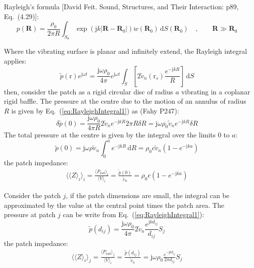 \documentclass[a4paper,UTF8]{ctexart}
\begin{document}
	Rayleigh's formula [David Feit. Sound, Structures, and Their Interaction: p89, Eq.~(4.29)]:
	\begin{equation}
	\label{eq:RayleighIntegral}
	p\left(\bm{R}\right)
	= \frac{\rho_0}{2\pi R}
		\int_{S_0} \exp\left(\mathrm jk\left\lvert\bm{R-R}_0\right\rvert \right)
		\ddot{w}\left(\bm{R}_0\right) \,\mathrm{d}S\left(\bm{R}_0\right)
			\quad,\qquad\bm{R}\gg\bm{R}_0
	\end{equation}
	
	Where the vibrating surface is planar and infinitely extend, the Rayleigh integral applies:
	\begin{equation}
	\label{eq:RayleighIntegral1}
	\tilde{p} \left( \bm{\mathrm{r}} \right) e^{\mathrm j\omega t} 
		= \frac{\mathrm j\omega\rho_0}{4\pi} e^{\mathrm j\omega t}
			\int_S \left[ 2\tilde{v}_n\left( \bm{\mathrm{r}}_s\right)
				\frac{e^{-\mathrm jkR}}{R} \right] \,\mathrm{d}S
	\end{equation}
	then, consider the patch as a rigid circular disc of radius $a$ vibrating in a coplanar rigid baffle. The pressure at the centre due to the motion of an annulus of radius $R$ is given by Eq.~(\ref{eq:RayleighIntegral1}) as (Fahy P247):
	\begin{equation}
	\label{eq:deltaP}
	\delta \tilde {p}\left(0\right)
		=\frac{\mathrm j\omega\rho_0}{4\pi R} 
			2\tilde{v}_n e^{-\mathrm jkR} 2\pi R \delta R
		= \mathrm j \omega \rho_0 \tilde{v}_n e^{-\mathrm jkR} \delta R
	\end{equation}
	The total pressure at the centre is given by the integral over the limits 0 to $a$:
	\begin{equation}
	\label{eq:RadiatedImpPslef}
	\tilde{p}\left(0\right) 
		= \mathrm j \omega \rho \tilde{v}_n \int_{0}^{a} e^{-\mathrm jkR} \,\mathrm{d}R
		= \rho_0 c \tilde{v}_n \left( 1-e^{-\mathrm jka} \right)
	\end{equation}
	the patch impedance:
	\begin{eqnarray}
	\label{eq:RaditedImpZself}
	\langle\langle Z \rangle_i \rangle_i 
		 = \frac{\langle P_{\text{rad}} \rangle_i}{\langle V \rangle_i}
		 = \frac{\tilde{p}\left(0\right)}{\tilde{v}_n}
		 = \rho_0 c \left( 1-e^{-\mathrm jka} \right)
	\end{eqnarray}
	
	Consider the patch $j$, if the patch dimensions are small, the integral can be approximated by the value at the central point times the patch area. The pressure at patch $j$ can be write from Eq.~(\ref{eq:RayleighIntegral1}):
	\begin{equation}
	\label{eq:patch_j_pressure}
	\tilde{p}\left( d_{ij} \right)
	= \frac{\mathrm j\omega\rho_0}{4\pi} 2\tilde{v}_n 
		\frac{e^{\mathrm jkd_{ij}}}{d_{ij}} S_{j}
	\end{equation}
	the patch impedance:
	\begin{eqnarray}
	\label{eq:RaditedImpZdiff}
	\langle\langle Z \rangle_i \rangle_j 
	= \frac{\langle P_{\text{rad}} \rangle_j}{\langle V \rangle_i}
	= \frac{\tilde{p}\left( d_{ij} \right)}{\tilde{v}_n}
	= \mathrm j\omega\rho_0 \frac{e^{-\mathrm jkd_{ij}}}{2\pi d_{ij}} S_j
	\end{eqnarray}
	
\end{document}
